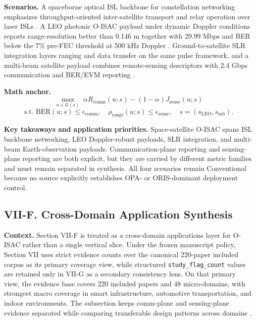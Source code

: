 \textbf{Scenarios.} A spaceborne optical ISL backbone for constellation networking emphasizes throughput-oriented inter-satellite transport and relay operation over laser ISLs \cite{O_ISAC_089}. A LEO photonic O-ISAC payload under dynamic Doppler conditions reports range-resolution better than 0.146 m together with 29.99 Mbps and BER below the 7\% pre-FEC threshold at 500 kHz Doppler \cite{O_ISAC_187}. Ground-to-satellite SLR integration layers ranging and data transfer on the same pulse framework, and a multi-beam satellite payload combines remote-sensing descriptors with 2.4 Gbps communication and BER/EVM reporting \cite{O_ISAC_137,O_ISAC_195}.

\textbf{Math anchor.}
\[
\max_{u\in\mathcal{U}(s)}\;\alpha R_{\mathrm{comm}}(u;s)-(1-\alpha)J_{\mathrm{sense}}(u;s)
\]
\[
\text{s.t. } \mathrm{BER}(u;s)\le\epsilon_{\mathrm{comm}},\quad \rho_{\mathrm{range}}(u;s)\le\epsilon_{\mathrm{sense}},\quad s=(s_{\mathrm{LEO}},s_{\mathrm{mb}}).
\]

\textbf{Key takeaways and application priorities.} Space-satellite O-ISAC spans ISL backbone networking, LEO Doppler-robust payloads, SLR integration, and multi-beam Earth-observation payloads. Communication-plane reporting and sensing-plane reporting are both explicit, but they are carried by different metric families and must remain separated in synthesis. All four scenarios remain Conventional because no source explicitly establishes OPA- or ORIS-dominant deployment control.

\subsection{VII-F. Cross-Domain Application Synthesis}

\textbf{Context.} Section VII-F is treated as a cross-domain applications layer for O-ISAC rather than a single vertical slice. Under the frozen manuscript policy, Section VII uses strict evidence counts over the canonical 220-paper included corpus as its primary coverage view, while structured \texttt{study\_flag\_count} values are retained only in VII-G as a secondary consistency lens. On that primary view, the evidence base covers 220 included papers and 48 micro-domains, with strongest macro coverage in smart infrastructure, automotive transportation, and indoor environments. The subsection keeps comm-plane and sensing-plane evidence separated while comparing transferable design patterns across domains \cite{O_ISAC_074,O_ISAC_164,O_ISAC_187}.

